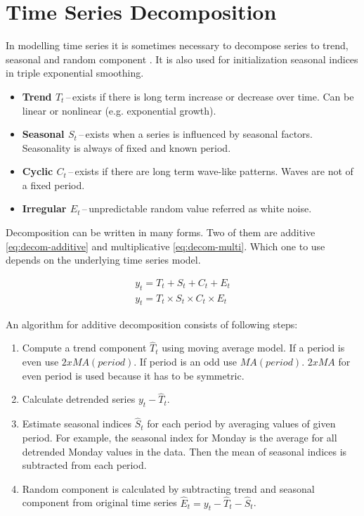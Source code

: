     \section{Time Series Decomposition} \label{sec:decomposition}
    In modelling time series it is sometimes necessary to decompose series to trend, seasonal and random component
    \cite{otexts}. It is also used for initialization seasonal indices in triple exponential smoothing.

    \begin{itemize}
        \item \textbf{Trend $ T_{t} $}\,--\,exists if there is long term increase or decrease over
            time. Can be linear or nonlinear (e.g. exponential growth).
        \item \textbf{Seasonal $ S_{t} $}\,--\,exists when a series is influenced by seasonal factors.
            Seasonality is always of fixed and known period.
        \item \textbf{Cyclic $ C_{t} $}\,--\,exists if there are long term wave-like patterns.
            Waves are not of a fixed period.
        \item \textbf{Irregular $ E_{t} $}\,--\,unpredictable random value referred as white
            noise. 
    \end{itemize}

    Decomposition can be written in many forms. Two of them are additive \ref{eq:decom-additive} and multiplicative
    \ref{eq:decom-multi}. Which one to use depends on the underlying time series model.

    \begin{gather} \label{eq:decom-additive}
        y_{t} = T_{t} + S_{t} + C_{t} + E_{t} \\
        y_{t} = T_{t} \times S_{t} \times C_{t} \times E_{t} \label{eq:decom-multi}
    \end{gather}

    An algorithm for additive decomposition consists of following steps:

    \begin{enumerate}
        \item Compute a trend component $\hat{T}_t$ using moving average model. If a period is even use
        $2 x MA(period)$. If period is an odd use $MA(period)$. $2 x MA$ for even period is used because it
        has to be symmetric.
        \item Calculate detrended series $y_t - \hat{T}_t$.
        \item Estimate seasonal indices $\hat{S}_t$ for each period by averaging values of given period. For example,
         the seasonal index for Monday is the average for all detrended Monday values in the data. Then the mean of
         seasonal indices is subtracted from each period.
        \item Random component is calculated by subtracting trend and seasonal component from original time series
            $\hat{E}_t = y_t - \hat{T}_t - \hat{S}_t$.
    \end{enumerate}

